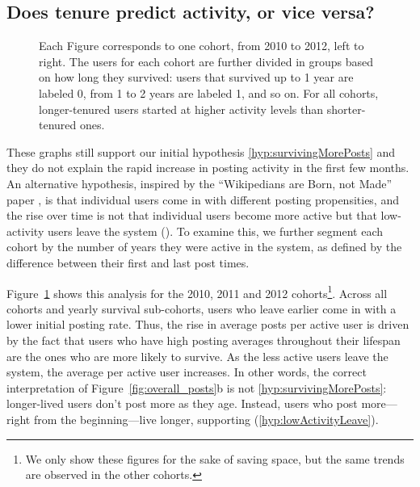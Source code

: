 \subsection{Does tenure predict activity, or vice versa?}

\begin{figure}[!tb]
\centering
{}
\caption{Each Figure corresponds to one cohort, from 2010 to 2012, left to right. The users for each cohort are further divided in groups based on how long they survived: users that survived up to 1 year are labeled 0, from 1 to 2 years are labeled 1, and so on.  For all cohorts, longer-tenured users started at higher activity levels than shorter-tenured ones.}
\label{fig:avr_posts_per_user_for_surviving_year}
\end{figure}

These graphs still support our initial hypothesis \ref{hyp:survivingMorePosts} 
and they do not explain the rapid increase in posting activity in the first few months.  An alternative hypothesis, inspired by the ``Wikipedians are Born, not Made'' paper \cite{Panciera2009}, is that individual users come in with different posting propensities, and the rise over time is not that individual users become more active but that low-activity users leave the system (\Hypothesis\label{hyp:lowActivityLeave}).  To examine this, we further segment each cohort by the number of years they were active in the system, as defined by the difference between their first and last post times.
 
Figure~\ref{fig:avr_posts_per_user_for_surviving_year} shows this analysis for the 2010, 2011 and 2012 cohorts\footnote{We only show these figures for the sake of saving space, but the same trends are observed in the other cohorts.}.  Across all cohorts and yearly survival sub-cohorts, users who leave earlier come in with a lower initial posting rate.  Thus, the rise in average posts per active user is driven by the fact that users who have high posting averages throughout their lifespan are the ones who are more likely to survive.  As the less active users leave the system, the average per active user increases.  In other words, the correct interpretation of Figure~\ref{fig:overall_posts}b is not \ref{hyp:survivingMorePosts}: longer-lived users don't post more as they age.  Instead, users who post more---right from the beginning---live longer, supporting (\ref{hyp:lowActivityLeave}). 

